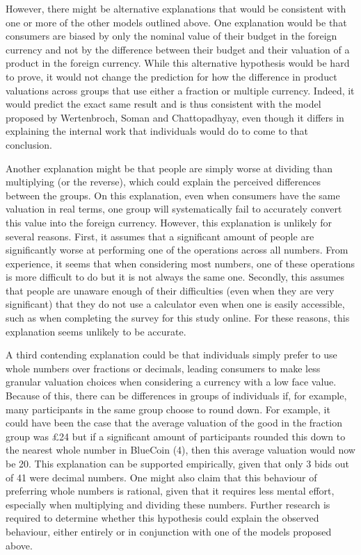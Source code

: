 \documentclass[
]{report}
\begin{document}
However, there might be alternative explanations that would be
consistent with one or more of the other models outlined above. One
explanation would be that consumers are biased by only the nominal value
of their budget in the foreign currency and not by the difference
between their budget and their valuation of a product in the foreign
currency. While this alternative hypothesis would be hard to prove, it
would not change the prediction for how the difference in product
valuations across groups that use either a fraction or multiple
currency. Indeed, it would predict the exact same result and is thus
consistent with the model proposed by Wertenbroch, Soman and
Chattopadhyay, even though it differs in explaining the internal work
that individuals would do to come to that conclusion.

Another explanation might be that people are simply worse at dividing
than multiplying (or the reverse), which could explain the perceived
differences between the groups. On this explanation, even when consumers
have the same valuation in real terms, one group will systematically
fail to accurately convert this value into the foreign currency.
However, this explanation is unlikely for several reasons. First, it
assumes that a significant amount of people are significantly worse at
performing one of the operations across all numbers. From experience, it
seems that when considering most numbers, one of these operations is
more difficult to do but it is not always the same one. Secondly, this
assumes that people are unaware enough of their difficulties (even when
they are very significant) that they do not use a calculator even when
one is easily accessible, such as when completing the survey for this
study online. For these reasons, this explanation seems unlikely to be
accurate.

A third contending explanation could be that individuals simply prefer
to use whole numbers over fractions or decimals, leading consumers to
make less granular valuation choices when considering a currency with a
low face value. Because of this, there can be differences in groups of
individuals if, for example, many participants in the same group choose
to round down. For example, it could have been the case that the average
valuation of the good in the fraction group was £24 but if a significant
amount of participants rounded this down to the nearest whole number in
BlueCoin (4), then this average valuation would now be 20. This
explanation can be supported empirically, given that only 3 bids out of
41 were decimal numbers. One might also claim that this behaviour of
preferring whole numbers is rational, given that it requires less mental
effort, especially when multiplying and dividing these numbers. Further
research is required to determine whether this hypothesis could explain
the observed behaviour, either entirely or in conjunction with one of
the models proposed above.
\end{document}
